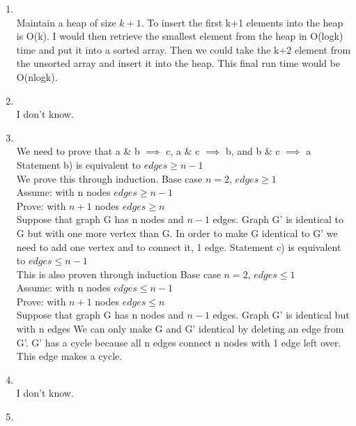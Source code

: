 \documentclass[11pt]{article}
\begin{document}
\begin{enumerate}
            \item \\
            Maintain a heap of size $k+1$.  To insert the first k+1 elements into the heap is O(k).
            I would then retrieve the smallest element from the heap in O(logk) time and put it into
            a sorted array.  Then we could take the k+2 element from the unsorted array and insert it
            into the heap.  This final run time would be O(nlogk).
            \item \\ I don't know.\\
            \item \\
            We need to prove that a \& b $\implies$ c, a \& c $\implies$ b, and b \& c $\implies$ a\\
            \newline
            Statement b) is equivalent to $edges\geq n-1$\\
            We prove this through induction.  Base case $n=2$, $edges\geq1$\\
            Assume: with n nodes $edges\geq n-1$\\
            Prove: with $n+1$ nodes $edges\geq n$\\
            Suppose that graph G has n nodes and $n-1$ edges.  Graph G' is identical to G but with
            one more vertex than G.  In order to make G identical to G' we need to add one vertex and
            to connect it, 1 edge.
            \newline
            \newline
            Statement c) is equivalent to $edges\leq n-1$\\
            This is also proven through induction
            Base case $n=2$, $edges\leq1$\\
            Assume: with n nodes $edges\leq n-1$\\
            Prove: with $n+1$ nodes $edges\leq n$\\
            Suppose that graph G has n nodes and $n-1$ edges.  Graph G' is identical but with n edges
            We can only make G and G' identical by deleting an edge from G'.  G' has a cycle because all
            n edges connect n nodes with 1 edge left over.  This edge makes a cycle.
            \item \\ I don't know.\\
            \item \\

\end{enumerate}
\end{document}
